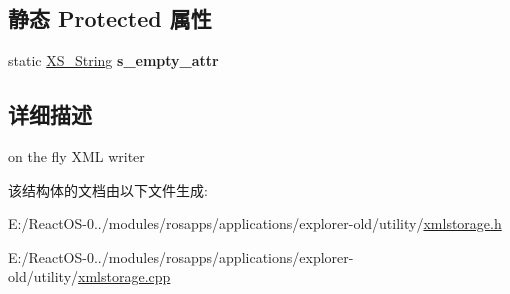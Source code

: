 \subsection*{静态 Protected 属性}
\begin{DoxyCompactItemize}
\item 
\mbox{\label{struct_x_m_l_storage_1_1_x_m_l_writer_a14e8db214f15915c8fcf41d3b7206e9b}} 
static \hyperlink{struct_x_m_l_storage_1_1_x_s___string}{X\+S\+\_\+\+String} {\bfseries s\+\_\+empty\+\_\+attr}
\end{DoxyCompactItemize}


\subsection{详细描述}
on the fly X\+ML writer 

该结构体的文档由以下文件生成\+:\begin{DoxyCompactItemize}
\item 
E\+:/\+React\+O\+S-\/0../modules/rosapps/applications/explorer-\/old/utility/\hyperlink{xmlstorage_8h}{xmlstorage.\+h}\item 
E\+:/\+React\+O\+S-\/0../modules/rosapps/applications/explorer-\/old/utility/\hyperlink{xmlstorage_8cpp}{xmlstorage.\+cpp}\end{DoxyCompactItemize}
